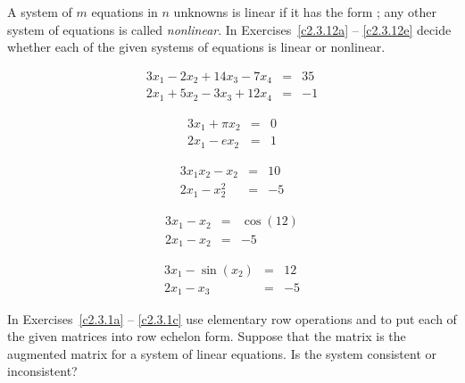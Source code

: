 \documentclass{ximera}
\begin{document}
\noindent A system of $m$ equations in $n$ unknowns is linear if it has
the form ; any other system of equations is called 
{\em nonlinear\/}.   In Exercises~\ref{c2.3.12a} -- 
\ref{c2.3.12e} decide whether each of the given systems of equations 
is linear or nonlinear.
\begin{exercise} \label{c2.3.12a}
\[
\begin{array}{rcl}
3x_1 - 2x_2 +14x_3-7x_4 & = & 35\\
2x_1 + 5x_2 - 3x_3 + 12x_4 & = & -1
\end{array}
\]
\end{exercise}
\begin{exercise} \label{c2.3.12b}
\[
\begin{array}{rcl}
3x_1 + \pi x_2  & = & 0\\
2x_1 - e x_2    & = & 1
\end{array}
\]
\end{exercise}
\begin{exercise} \label{c2.3.12c}
\[
\begin{array}{rcl}
3x_1x_2 -x_2  & = & 10\\
2x_1 -   x_2^2    & = & -5
\end{array}
\]
\end{exercise}
\begin{exercise} \label{c2.3.12d}
\[
\begin{array}{rcl}
3x_1  -x_2  & = & \cos(12)\\
2x_1 -   x_2    & = & -5
\end{array}
\]
\end{exercise}
\begin{exercise} \label{c2.3.12e}
\[
\begin{array}{rcl}
3x_1  - \sin(x_2)  & = & 12\\
2x_1 -   x_3    & = & -5
\end{array}
\]
\end{exercise}

\CEXER



\noindent In Exercises~\ref{c2.3.1a} -- \ref{c2.3.1c} use elementary row
operations and \Matlab to put each of the given matrices into row echelon
form.  Suppose that the matrix is the augmented matrix for a system of
linear equations.  Is the system consistent or inconsistent?
\end{document}
